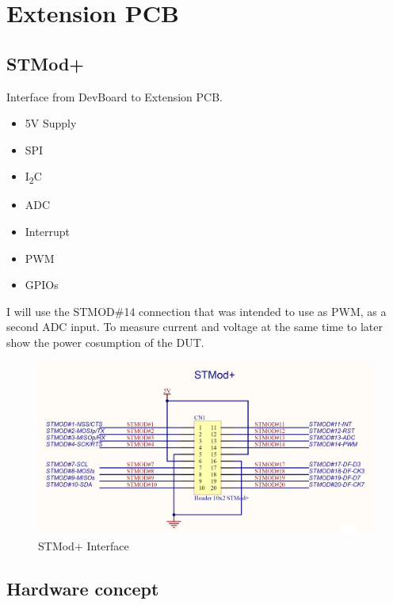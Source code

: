 \newpage


\section{Extension PCB}
\label{sec:Extension PCB}



\subsection{STMod+}
Interface from DevBoard to Extension PCB. 

\begin{itemize}
    \item 5V Supply
    \item SPI 
    \item I\textsubscript{2}C
    \item ADC
    \item Interrupt
    \item PWM
    \item GPIOs
\end{itemize}

I will use the STMOD\#14 connection that was intended to use as PWM, as a second ADC input. To measure current and voltage at the same time to later show the power cosumption of the DUT.

\begin{figure}[H]
	\centering
	\includegraphics[width=13cm]{Resources/Pictures/STMOD_Interface.png}
	\caption{STMod+ Interface}
	\label{fig:STMod+ Interface}
\end{figure}




\newpage

\subsection{Hardware concept}

